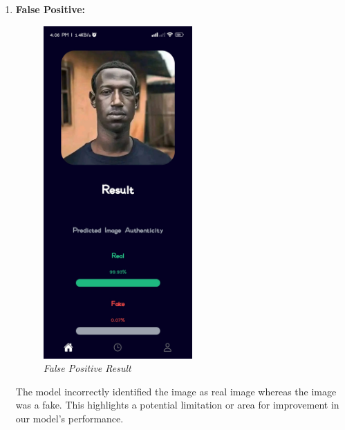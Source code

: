 \begin{enumerate}
          \newpage
    \item \textbf{False Positive:}
          \\
          \begin{figure}[ht]
              \centering
              \includegraphics[height =5in  ]{img/blckzukeOutput.jpg}
              \caption{\textit{False Positive Result}}
          \end{figure}

          The model incorrectly identified the image as real image whereas the image was a fake. This highlights a potential limitation or area for improvement in our model's performance.

          \newpage


\end{enumerate}
